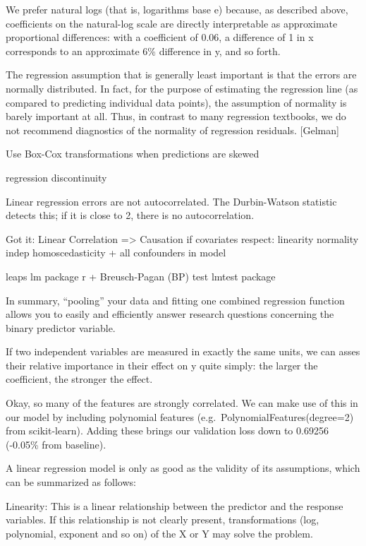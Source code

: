 \documentclass[]{book}
\theoremstyle{definition}
\theoremstyle{definition}
\theoremstyle{definition}
\theoremstyle{remark}
\begin{document}
We prefer natural logs (that is, logarithms base e) because, as
described above, coefficients on the natural-log scale are directly
interpretable as approximate proportional differences: with a
coefficient of 0.06, a difference of 1 in x corresponds to an
approximate 6\% difference in y, and so forth.

The regression assumption that is generally least important is that the
errors are normally distributed. In fact, for the purpose of estimating
the regression line (as compared to predicting individual data points),
the assumption of normality is barely important at all. Thus, in
contrast to many regression textbooks, we do not recommend diagnostics
of the normality of regression residuals. {[}Gelman{]}

Use Box-Cox transformations when predictions are skewed

regression discontinuity

Linear regression errors are not autocorrelated. The Durbin-Watson
statistic detects this; if it is close to 2, there is no
autocorrelation.

Got it: Linear Correlation =\textgreater{} Causation if covariates
respect: linearity normality indep homoscedasticity + all confounders in
model

leaps lm package r + Breusch-Pagan (BP) test lmtest package

In summary, ``pooling'' your data and fitting one combined regression
function allows you to easily and efficiently answer research questions
concerning the binary predictor variable.

If two independent variables are measured in exactly the same units, we
can asses their relative importance in their effect on y quite simply:
the larger the coefficient, the stronger the effect.

Okay, so many of the features are strongly correlated. We can make use
of this in our model by including polynomial features
(e.g.~PolynomialFeatures(degree=2) from scikit-learn). Adding these
brings our validation loss down to 0.69256 (-0.05\% from baseline).

A linear regression model is only as good as the validity of its
assumptions, which can be summarized as follows:

Linearity: This is a linear relationship between the predictor and the
response variables. If this relationship is not clearly present,
transformations (log, polynomial, exponent and so on) of the X or Y may
solve the problem.
\end{document}
